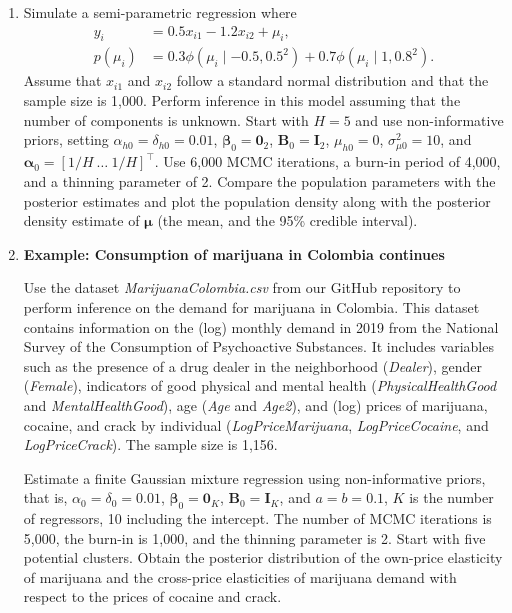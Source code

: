 \begin{enumerate}
	\item Simulate a semi-parametric regression where  
	\begin{align*}
		y_i &= 0.5x_{i1} - 1.2x_{i2} + \mu_i, \\
		p(\mu_i) &= 
		0.3 \phi(\mu_i \mid -0.5,0.5^2) + 0.7 \phi(\mu_i \mid 1,0.8^2).		
	\end{align*}
	Assume that $x_{i1}$ and $x_{i2}$ follow a standard normal distribution and that the sample size is 1,000. Perform inference in this model assuming that the number of components is unknown. Start with $H=5$ and use non-informative priors, setting $\alpha_{h0}=\delta_{h0}=0.01$, $\boldsymbol{\beta}_0=\boldsymbol{0}_2$, $\boldsymbol{B}_0=\boldsymbol{I}_2$, $\mu_{h0}=0$, $\sigma^2_{\mu 0}=10$, and $\boldsymbol{\alpha}_0=[1/H \ \dots \ 1/H]^{\top}$. Use 6,000 MCMC iterations, a burn-in period of 4,000, and a thinning parameter of 2. Compare the population parameters with the posterior estimates and plot the population density along with the posterior density estimate of $\boldsymbol{\mu}$ (the mean, and the 95\% credible interval).
	
	\item \textbf{Example: Consumption of marijuana in Colombia continues}
	
	Use the dataset \textit{MarijuanaColombia.csv} from our GitHub repository to perform inference on the demand for marijuana in Colombia. This dataset contains information on the (log) monthly demand in 2019 from the National Survey of the Consumption of Psychoactive Substances. It includes variables such as the presence of a drug dealer in the neighborhood (\textit{Dealer}), gender (\textit{Female}), indicators of good physical and mental health (\textit{PhysicalHealthGood} and \textit{MentalHealthGood}), age (\textit{Age} and \textit{Age2}), and (log) prices of marijuana, cocaine, and crack by individual (\textit{LogPriceMarijuana}, \textit{LogPriceCocaine}, and \textit{LogPriceCrack}). The sample size is 1,156.
	
	Estimate a finite Gaussian mixture regression using non-informative priors, that is, $\alpha_{0}=\delta_{0}=0.01$, $\boldsymbol{\beta}_{0}=\boldsymbol{0}_K$, $\boldsymbol{B}_{0}=\boldsymbol{I}_K$, and $a=b=0.1$, $K$ is the number of regressors, 10 including the intercept. The number of MCMC iterations is 5,000, the burn-in is 1,000, and the thinning parameter is 2. Start with five potential clusters. Obtain the posterior distribution of the own-price elasticity of marijuana and the cross-price elasticities of marijuana demand with respect to the prices of cocaine and crack.
	

\end{enumerate}
